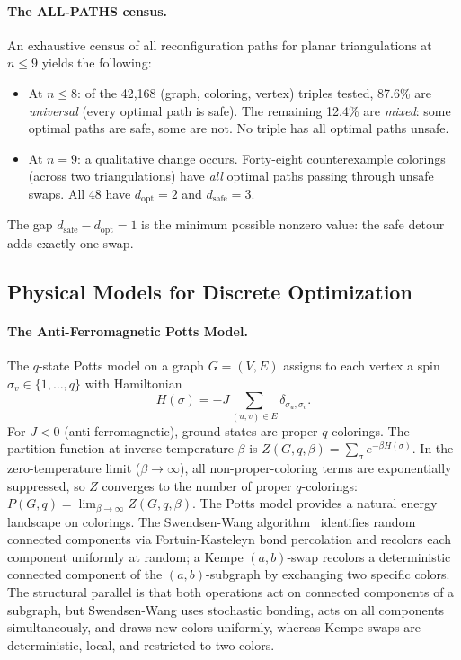 \paragraph{The ALL-PATHS census.}
An exhaustive census of all reconfiguration paths for planar
triangulations at $n \leq 9$ yields the following:
\begin{itemize}
  \item At $n \leq 8$: of the 42{,}168 (graph, coloring, vertex)
    triples tested, 87.6\% are \emph{universal} (every optimal path is
    safe). The remaining
    12.4\% are \emph{mixed}: some optimal paths are safe, some are not.
    No triple has all optimal paths unsafe.
  \item At $n = 9$: a qualitative change occurs. Forty-eight
    counterexample colorings (across two triangulations) have \emph{all}
    optimal paths passing through unsafe swaps. All 48 have
    $d_{\text{opt}} = 2$ and $d_{\text{safe}} = 3$.
\end{itemize}

The gap $d_{\text{safe}} - d_{\text{opt}} = 1$ is the minimum
possible nonzero value: the safe detour adds exactly one swap.

\subsection{Physical Models for Discrete Optimization}
\label{sec:phys-models}

\paragraph{The Anti-Ferromagnetic Potts Model.}
The $q$-state Potts model on a graph $G = (V, E)$ assigns to each
vertex a spin $\sigma_v \in \{1, \ldots, q\}$ with Hamiltonian
\begin{equation}\label{eq:potts}
  H(\sigma) = -J \sum_{(u,v) \in E} \delta_{\sigma_u, \sigma_v}.
\end{equation}
For $J < 0$ (anti-ferromagnetic), ground states are proper
$q$-colorings. The partition function at inverse temperature $\beta$ is
$Z(G, q, \beta) = \sum_\sigma e^{-\beta H(\sigma)}$. In the
zero-temperature limit ($\beta \to \infty$), all non-proper-coloring
terms are exponentially suppressed, so $Z$ converges to the number of
proper $q$-colorings:
$P(G, q) = \lim_{\beta \to \infty} Z(G, q, \beta)$.
The Potts model provides a natural energy landscape on colorings.
The Swendsen-Wang algorithm~\cite{swendsen1987} identifies random
connected components via Fortuin-Kasteleyn bond percolation and
recolors each component uniformly at random; a Kempe $(a,b)$-swap
recolors a deterministic connected component of the $(a,b)$-subgraph
by exchanging two specific colors. The structural parallel is that
both operations act on connected components of a subgraph, but
Swendsen-Wang uses stochastic bonding, acts on all components
simultaneously, and draws new colors uniformly, whereas Kempe swaps
are deterministic, local, and restricted to two colors.

